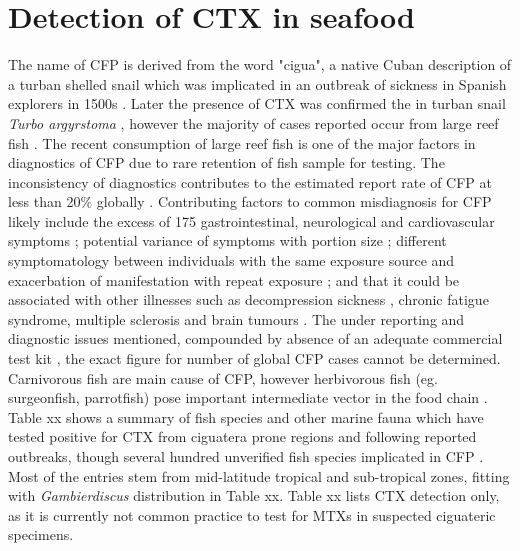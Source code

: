 \documentclass[12pt]{article}
\begin{document}
\section{Detection of CTX in seafood}
The name of CFP is derived from the word "cigua", a native Cuban description of a turban shelled snail which was implicated in an outbreak of sickness in Spanish explorers in 1500s \cite{gudger1930poisonous}. Later the presence of CTX was confirmed the in turban snail \emph{Turbo argyrstoma} \cite{yasumoto1976toxicity}, however the majority of cases reported occur from large reef fish \cite{hokama2001ciguatera,lewis2001changing,dechraoui2005use,laurent2005ciguatera}. The recent consumption of large reef fish is one of the major factors in diagnostics of CFP due to rare retention of fish sample for testing.
The inconsistency of diagnostics contributes to the estimated report rate of CFP at less than 20\% globally \cite{dickey2010ciguatera}. Contributing factors to common misdiagnosis for CFP likely include the excess of 175 gastrointestinal, neurological and cardiovascular symptoms \cite{sims1987theoretical}; potential variance of symptoms with portion size \cite{wong2008features,mak2013pacific}; different symptomatology between individuals with the same exposure source and exacerbation of manifestation with repeat exposure \cite{bagnis1979clinical,glaziou1993study}; and that it could be associated with other illnesses such as decompression sickness \cite{adams1993outbreak}, chronic fatigue syndrome, multiple sclerosis \cite{lindsay1997chronic,ting2001ciguatera} and brain tumours \cite{lindsay1997chronic}.
The under reporting and diagnostic issues mentioned, compounded by absence of an adequate commercial test kit \cite{wong2005study}, the exact figure for number of global CFP cases cannot be determined. Carnivorous fish are main cause of CFP, however herbivorous fish (eg. surgeonfish, parrotfish) pose important intermediate vector in the food chain \cite{cruz2006macroalgal,randall1958review,mak2013pacific}.%
Table xx shows a summary of fish species and other marine fauna which have tested positive for CTX from ciguatera prone regions and following reported outbreaks, though several hundred unverified fish species implicated in CFP \cite{}. %
Most of the entries stem from mid-latitude tropical and sub-tropical zones, fitting with \emph{Gambierdiscus} distribution in Table xx. Table xx lists CTX detection only, as it is currently not common practice to test for MTXs in suspected ciguateric specimens. 
\end{document}
